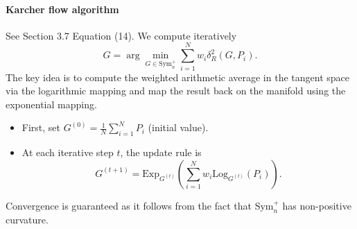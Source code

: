\documentclass[10pt,a4paper]{book}
\theoremstyle{definition}
\theoremstyle{plain}
\theoremstyle{remark}
\begin{document}
\paragraph{Karcher flow algorithm} See \cite{pennec2006riemannian} Section 3.7 Equation (14). We compute iteratively
$$G=\arg \min_{G\in \text{Sym}_n^{+}}\sum_{i=1}^{N}w_i\delta_R^{2}(G,P_i).$$
The key idea is to compute the weighted arithmetic average in the tangent space via the logarithmic mapping and map the result back on the manifold using the exponential mapping.
\begin{itemize}
\item First, set $G^{(0)}=\frac{1}{N}\sum_{i=1}^{N}P_i$ (initial value). 
\item At each iterative step $t$, the update rule is
$$G^{(t+1)}=\text{Exp}_{G^{(t)}}\left(\sum_{i=1}^{N}w_i\text{Log}_{G^{(t)}}(P_i)\right).$$
\end{itemize}
Convergence is guaranteed as it follows from the fact that $\text{Sym}_{n}^{+}$ has non-positive curvature. 
\end{document}
